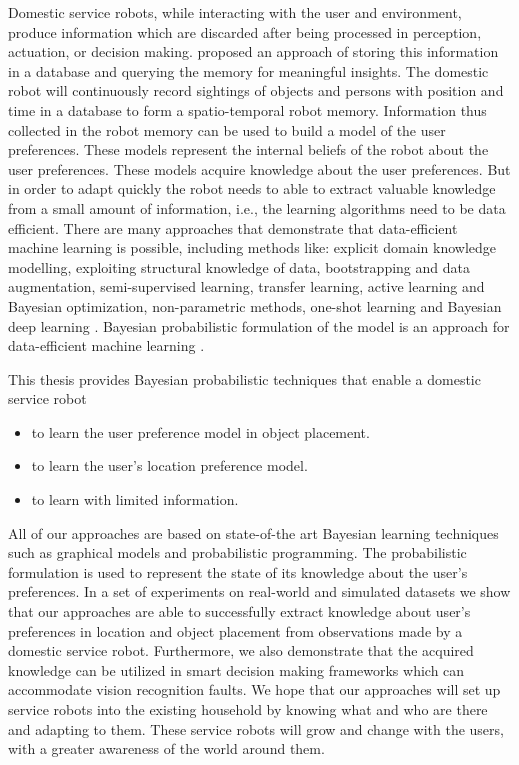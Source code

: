 Domestic service robots, while interacting with the user and environment, produce information which are discarded after being processed in perception, actuation, or decision making. \cite{niemueller2012generic} proposed an approach of storing this information in a database and querying the memory for meaningful insights. 
The domestic robot will continuously record sightings of objects and persons with position and time in a database to form a spatio-temporal robot memory.
Information thus collected in the robot memory can be used to build a model of the user preferences. These models represent the internal beliefs of the robot about the user preferences. These models acquire knowledge about the user preferences. But in order to adapt quickly the robot needs to able to extract valuable knowledge from a small amount of information, i.e., the learning algorithms need to be data efficient. There are many approaches that demonstrate that data-efficient machine learning is possible, including methods like: explicit domain knowledge modelling, exploiting structural knowledge of data, bootstrapping and data augmentation, semi-supervised learning, transfer learning, active learning and Bayesian optimization, non-parametric methods, one-shot learning and Bayesian deep learning \citep{MarcICML2016}. Bayesian probabilistic formulation of the model is an approach for data-efficient machine learning \cite{Bishop20120222}.


This thesis provides Bayesian probabilistic techniques that enable a domestic service robot
\begin{itemize}
	\item to learn the user preference model in object placement. 
	\item to learn the user's location preference model.
	\item to learn with limited information.
\end{itemize}


All of our approaches are based on state-of-the art Bayesian learning techniques such as graphical models and probabilistic programming. The probabilistic formulation is used to represent the state of its knowledge about the user's preferences. In a set of experiments on real-world and simulated datasets we show that our approaches are able to successfully extract knowledge about user's preferences in location and object placement from observations made by a domestic service robot. Furthermore, we also demonstrate that the acquired knowledge can be utilized in smart decision making frameworks which can accommodate vision recognition faults. We hope that our approaches will set up service robots into the existing household by knowing what and who are there and adapting to them. These service robots will grow and change with the users, with a greater awareness of the world around them.

